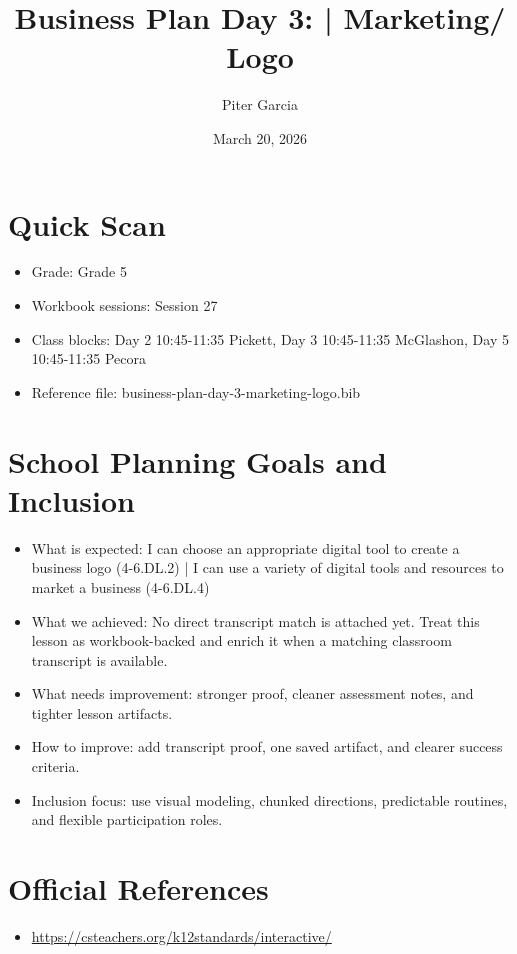 \documentclass[11pt]{article}
\title{Business Plan Day 3: | Marketing/ Logo}
\author{Piter Garcia}
\date{March 20, 2026}
\begin{document}
\maketitle
\section*{Quick Scan}
\begin{itemize}[leftmargin=*]
\item Grade: Grade 5
\item Workbook sessions: Session 27
\item Class blocks: Day 2 10:45-11:35 Pickett, Day 3 10:45-11:35 McGlashon, Day 5 10:45-11:35 Pecora
\item Reference file: business-plan-day-3-marketing-logo.bib
\end{itemize}
\section*{School Planning Goals and Inclusion}
\begin{itemize}[leftmargin=*]
\item What is expected: I can choose an appropriate digital tool to create a business logo (4-6.DL.2) | I can use a variety of digital tools and resources to market a business (4-6.DL.4)
\item What we achieved: No direct transcript match is attached yet. Treat this lesson as workbook-backed and enrich it when a matching classroom transcript is available.
\item What needs improvement: stronger proof, cleaner assessment notes, and tighter lesson artifacts.
\item How to improve: add transcript proof, one saved artifact, and clearer success criteria.
\item Inclusion focus: use visual modeling, chunked directions, predictable routines, and flexible participation roles.
\end{itemize}
\section*{Official References}
\begin{itemize}[leftmargin=*]
\item \url{https://csteachers.org/k12standards/interactive/}

\end{itemize}
\end{document}

